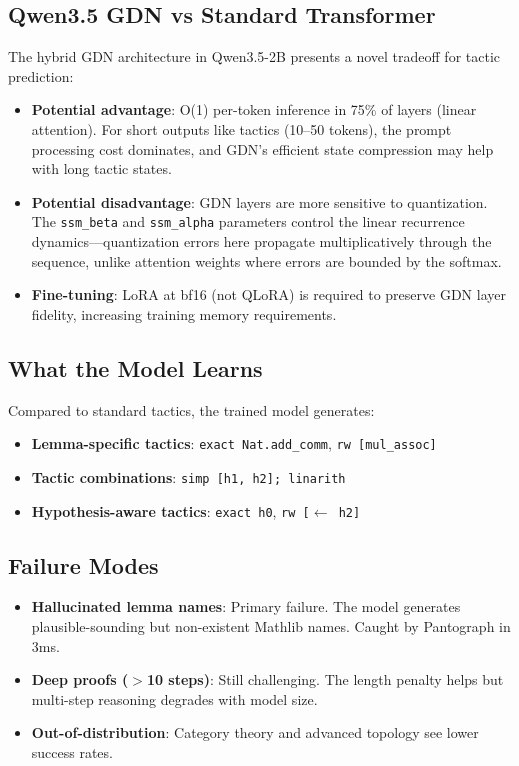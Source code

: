 \documentclass[11pt,a4paper]{article}
\begin{document}
\subsection{Qwen3.5 GDN vs Standard Transformer}

The hybrid GDN architecture in Qwen3.5-2B presents a novel tradeoff for tactic prediction:

\begin{itemize}
\item \textbf{Potential advantage}: O(1) per-token inference in 75\% of layers (linear attention). For short outputs like tactics (10--50 tokens), the prompt processing cost dominates, and GDN's efficient state compression may help with long tactic states.
\item \textbf{Potential disadvantage}: GDN layers are more sensitive to quantization. The \texttt{ssm\_beta} and \texttt{ssm\_alpha} parameters control the linear recurrence dynamics---quantization errors here propagate multiplicatively through the sequence, unlike attention weights where errors are bounded by the softmax.
\item \textbf{Fine-tuning}: LoRA at bf16 (not QLoRA) is required to preserve GDN layer fidelity, increasing training memory requirements.
\end{itemize}

\subsection{What the Model Learns}

Compared to standard tactics, the trained model generates:
\begin{itemize}
\item \textbf{Lemma-specific tactics}: \texttt{exact Nat.add\_comm}, \texttt{rw [mul\_assoc]}
\item \textbf{Tactic combinations}: \texttt{simp [h1, h2]; linarith}
\item \textbf{Hypothesis-aware tactics}: \texttt{exact h0}, \texttt{rw [$\leftarrow$ h2]}
\end{itemize}

\subsection{Failure Modes}

\begin{itemize}
\item \textbf{Hallucinated lemma names}: Primary failure. The model generates plausible-sounding but non-existent Mathlib names. Caught by Pantograph in 3ms.
\item \textbf{Deep proofs ($>$10 steps)}: Still challenging. The length penalty helps but multi-step reasoning degrades with model size.
\item \textbf{Out-of-distribution}: Category theory and advanced topology see lower success rates.
\end{itemize}
\end{document}
